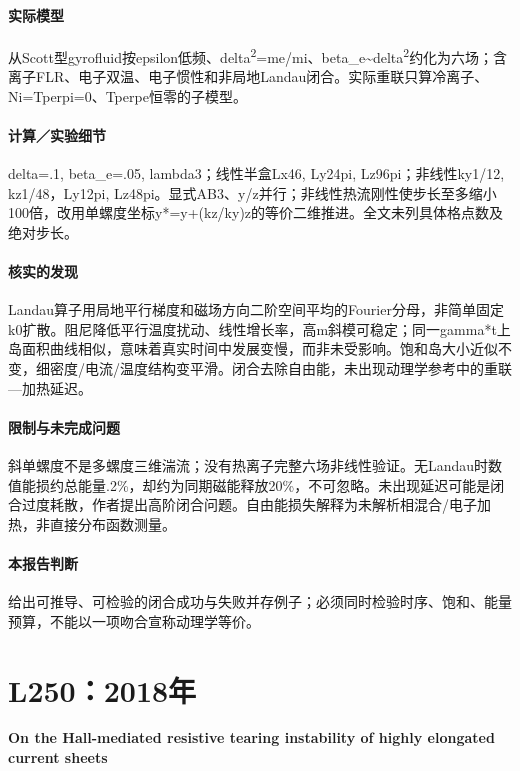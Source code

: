 \documentclass[UTF8,a4paper,11pt,openany,fontset=fandol]{ctexbook}
\begin{document}
\paragraph{实际模型}从Scott型gyrofluid按epsilon低频、delta\textsuperscript{2}=me/mi、beta\_e\textasciitilde{}delta\textsuperscript{2}约化为六场；含离子FLR、电子双温、电子惯性和非局地Landau闭合。实际重联只算冷离子、Ni=Tperpi=0、Tperpe恒零的子模型。

\paragraph{计算／实验细节}delta=.1, beta\_e=.05, lambda3；线性半盒Lx46, Ly24pi, Lz96pi；非线性ky1/12, kz1/48，Ly12pi, Lz48pi。显式AB3、y/z并行；非线性热流刚性使步长至多缩小100倍，改用单螺度坐标y*=y+(kz/ky)z的等价二维推进。全文未列具体格点数及绝对步长。

\paragraph{核实的发现}Landau算子用局地平行梯度和磁场方向二阶空间平均的Fourier分母，非简单固定k0扩散。阻尼降低平行温度扰动、线性增长率，高m斜模可稳定；同一gamma*t上岛面积曲线相似，意味着真实时间中发展变慢，而非未受影响。饱和岛大小近似不变，细密度/电流/温度结构变平滑。闭合去除自由能，未出现动理学参考中的重联—加热延迟。

\paragraph{限制与未完成问题}斜单螺度不是多螺度三维湍流；没有热离子完整六场非线性验证。无Landau时数值能损约总能量.2\%，却约为同期磁能释放20\%，不可忽略。未出现延迟可能是闭合过度耗散，作者提出高阶闭合问题。自由能损失解释为未解析相混合/电子加热，非直接分布函数测量。

\paragraph{本报告判断}给出可推导、可检验的闭合成功与失败并存例子；必须同时检验时序、饱和、能量预算，不能以一项吻合宣称动理学等价。

\section{L250：2018年}\label{paper:L250}

\textbf{On the Hall-mediated resistive tearing instability of highly elongated current sheets}\citep{L250}\
\end{document}
